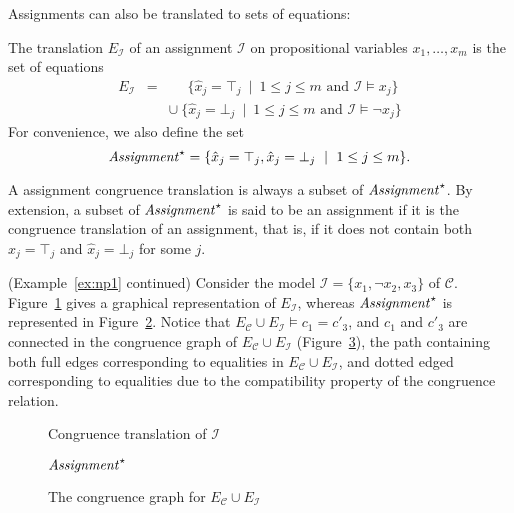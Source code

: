 \documentclass[smallextended]{svjour3}
\begin{document}
Assignments can also be translated to sets of equations:
\begin{definition}  The translation $E_{\mathcal{I}}$ of an assignment $\mathcal{I}$ on propositional variables $x_1,\ldots,x_m$ is the set of equations
\begin{eqnarray*}
  E_{\mathcal{I}} & = & \phantom{\cup}\ \{ \hat{x}_j = \top_j \ \mid\  1 \leq j \leq m \text{ and } \mathcal{I} \models x_j \} \\
               &   & \cup\ \{ \hat{x}_j = \bot_j \ \mid\ 1 \leq j \leq m \text{ and } \mathcal{I} \models \neg x_j \}
\end{eqnarray*}
For convenience, we also define the set
\begin{equation*}
  {\it Assignment}^\star = \{ \hat{x}_j = \top_j, \hat{x}_j = \bot_j \ \mid\ 1 \leq j \leq m\}.
\end{equation*}
\end{definition}
\noindent
A assignment congruence translation is always a subset of
${\it Assignment}^\star$.  By extension, a subset of ${\it Assignment}^\star$ is
said to be an assignment if it is the congruence translation of an assignment,
that is, if it does not contain both $\hat{x}_j = \top_j$ and $\hat{x}_j =
\bot_j$ for some $j$.

\begin{example}\label{ex:np2} (Example~\ref{ex:np1} continued)  
Consider the model $\mathcal{I} = \{x_1, \neg x_2, x_3\}$ of\/ $\mathcal{C}$.
Figure~\ref{fig:npassignment} gives a graphical representation of
$E_{\mathcal{I}}$, whereas ${\it Assignment}^\star$ is represented in
Figure~\ref{fig:npassignmentstar}.  Notice that
$E_{\mathcal{C}} \cup E_{\mathcal{I}} \models c_1 = c'_3$,
and $c_1$ and $c'_3$ are connected in the congruence graph
of $E_{\mathcal{C}} \cup E_{\mathcal{I}}$ (Figure~\ref{fig:npmodel}), the path containing both full edges corresponding to equalities in $E_{\mathcal{C}} \cup E_{\mathcal{I}}$, and dotted edged corresponding to equalities due to the compatibility property of the congruence relation.

\begin{figure}[ht]

\caption{Congruence translation of $\mathcal{I}$}
\label{fig:npassignment}
\end{figure}

\begin{figure}[ht]

\caption{${\it Assignment}^\star$}
\label{fig:npassignmentstar}
\end{figure}

\begin{figure}[ht]

\caption{The congruence graph for $E_{\mathcal{C}} \cup E_{\mathcal{I}}$}
\label{fig:npmodel}
\end{figure}
\end{example}
\end{document}
